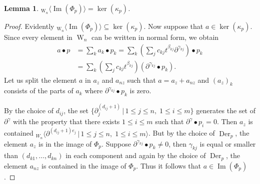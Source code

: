 \documentclass[a4paper,10pt]{article}
\newtheorem{Lemma}[Th]{Lemma}
\theoremstyle{nonumberplain}
\newtheorem{proof}{Proof}
\DeclareMathOperator{\W}{W}
\DeclareMathOperator{\Der}{Der}
\DeclareMathOperator{\Bild}{Im}
\begin{document}


\begin{Lemma}
\label{KomCom}
${}_{\W_n}\langle \Bild(\Phi_p) \rangle = \ker(\kappa_p)$.
\end{Lemma}

\begin{proof}
Evidently ${}_{\W_n} \langle \Bild(\Phi_p) \rangle \subseteq \ker(\kappa_p)$. Now suppose that 
$a \in \ker(\kappa_p)$. Since every element in $\W_n$ can be written in 
normal form, 
we obtain
\begin{align*}
 a \bullet p & = \sum_k a_k \bullet p_k = \sum_k ( \sum_j c_{kj} t^{\beta_{kj}} \partial^{\gamma_{kj}} ) \bullet p_k \\
& = \sum_k ( \sum_j c_{kj} t^{\beta_{kj}})( \partial^{\gamma_{kj}} \bullet p_k ).
\end{align*}
Let us split the element $a$ in $a_z$ and $a_{nz}$ such that $a=a_z+a_{nz}$ and $(a_z)_k$ consists of the parts of $a_k$ where $\partial^{\gamma_{kj}} \bullet p_k$ is zero. 

By the choice of $d_{ij}$, the set
$\{ \partial_j^{(d_{ij} +1)} \, | \, 1\leq j \leq n, \; 1 \leq i \leq m \}$
generates the set of $\partial^\gamma$
with the property that there exists $1 \leq i \leq m$ such that 
$ \partial^\gamma \bullet p_i=0.$
Then $a_z$ is contained 
${}_{W_n}\langle \partial^{(d_{ij} +1)e_j} \, | \, 1\leq j \leq n, \; 1 \leq i \leq m \rangle$. 
But by the choice of $\Der_p$, the element $a_z$ is in the image of $\Phi_p$. 
Suppose $\partial^{\gamma_{kj}} \bullet p_k \neq 0$, then $\gamma_{kj}$ is equal or smaller than 
$(d_{k1}, \dots, d_{kn})$ in each component and again 
by the choice of $\Der_p$, the element $a_{nz}$ is contained in the image of $\Phi_p$. 
Thus it follows that $a \in \Bild(\Phi_p)$.
\end{proof}
\end{document}
